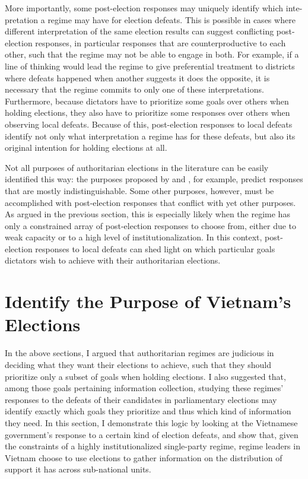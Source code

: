 \documentclass[12pt]{article}
\newcommand{\1}{\mathbbm{1}}
\begin{document}
More importantly, some post-election responses may uniquely identify which inte-pretation a regime may have for election defeats. This is possible in cases where different interpretation of the same election results can suggest conflicting post-election responses, in particular responses that are counterproductive to each other, such that the regime may not be able to engage in both. For example, if a line of thinking would lead the regime to give preferential treatment to districts where defeats happened when another suggests it does the opposite, it is necessary that the regime commits to only one of these interpretations. Furthermore, because dictators have to prioritize some goals over others when holding elections, they also have to prioritize some responses over others when observing local defeats. Because of this, post-election responses to local defeats identify not only what interpretation a regime has for these defeats, but also its original intention for holding elections at all. 

Not all purposes of authoritarian elections in the literature can be easily identified this way: the purposes proposed by \cite{Miller2015} and \cite{Geddes2005}, for example, predict responses that are mostly indistinguishable. Some other purposes, however, must be accomplished with post-election responses that conflict with yet other purposes. As argued in the previous section, this is especially likely when the regime has only a constrained array of post-election responses to choose from, either due to weak capacity or to a high level of institutionalization. In this context, post-election responses to local defeats can shed light on which particular goals dictators wish to achieve with their authoritarian elections.



\section{Identify the Purpose of Vietnam's Elections}
\label{sec:vietnam}

In the above sections, I argued that authoritarian regimes are judicious in deciding what they want their elections to achieve, such that they should prioritize only a subset of goals when holding elections. I also suggested that, among those goals pertaining information collection, studying these regimes' responses to the defeats of their candidates in parliamentary elections may identify exactly which goals they prioritize and thus which kind of information they need. In this section, I demonstrate this logic by looking at the Vietnamese government's response to a certain kind of election defeats, and show that, given the constraints of a highly institutionalized single-party regime, regime leaders in Vietnam choose to use elections to gather information on the distribution of support it has across sub-national units. 
\end{document}
